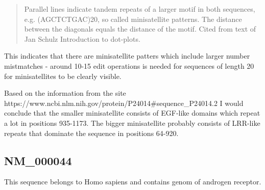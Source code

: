 \documentclass[11pt]{article}
\begin{document}
\begin{quote}
Parallel lines indicate tandem repeats of a larger motif in both
sequences, e.g. (AGCTCTGAC)20, so called minisatellite patterns. The
distance between the diagonals equals the distance of the motif. Cited
from text of Jan Schulz Introduction to dot-plots.
\end{quote}

This indicates that there are minisatellite patters which include larger
number mistmatches - around 10-15 edit operations is needed for
sequences of length 20 for minisatellites to be clearly visible.

Based on the information from the site
https://www.ncbi.nlm.nih.gov/protein/P24014\#sequence\_P24014.2 I would
conclude that the smaller minisatellite consists of EGF-like domains
which repeat a lot in positions 935-1173. The bigger minisatellite
probably consists of LRR-like repeats that dominate the sequence in
positions 64-920.

    \subsection{NM\_000044}\label{nm_000044}

This sequence belongs to Homo sapiens and contains genom of androgen
receptor.
\end{document}
